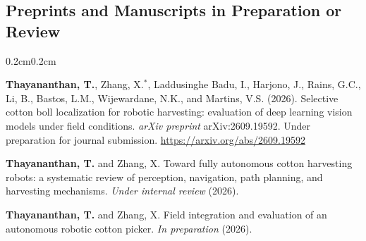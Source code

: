 \documentclass[10pt, letterpaper]{article}
\newcommand{\textbfr}[1]{\textbf{#1}}
\newenvironment{onecolentry}{%
    \begin{adjustwidth}{0.2cm}{0.2cm}
}{\end{adjustwidth}}
\newenvironment{pubsS}{%
  \begin{enumerate}[label={[S\arabic*]}, leftmargin=1.15cm, labelsep=0.2cm,
                    topsep=0.08cm, parsep=0.08cm, partopsep=0pt, itemsep=0pt]
}{\end{enumerate}}
\begin{document}
\subsection{Preprints and Manuscripts in Preparation or Review}
\begin{onecolentry}
\begin{pubsS}
    \item \textbfr{Thayananthan, T.}, Zhang, X.$^{*}$, Laddusinghe Badu, I.,
    Harjono, J., Rains, G.C., Li, B., Bastos, L.M., Wijewardane, N.K., and
    Martins, V.S. (2026). Selective cotton boll localization for robotic harvesting:
    evaluation of deep learning vision models under field conditions.
    \emph{arXiv preprint} arXiv:2609.19592. Under preparation for journal
    submission. \url{https://arxiv.org/abs/2609.19592}

    \item \textbfr{Thayananthan, T.} and Zhang, X. Toward fully autonomous cotton
    harvesting robots: a systematic review of perception, navigation, path planning,
    and harvesting mechanisms. \emph{Under internal review} (2026).

    \item \textbfr{Thayananthan, T.} and Zhang, X. Field integration and evaluation of
    an autonomous robotic cotton picker. \emph{In preparation} (2026).
\end{pubsS}
\end{onecolentry}
\vspace{0.12cm}
\end{document}
